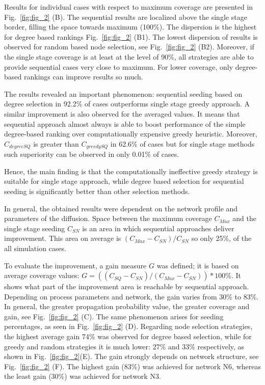 \documentclass[11pt]{article} %
\begin{document}
Results for individual cases with respect to maximum coverage are presented in Fig.~\ref{fig:fig_2} (B). The sequential  results are localized above the single stage border, filling the space towards maximum (100\%). The dispersion is the highest for degree based rankings Fig.~\ref{fig:fig_2} (B1). The lowest dispersion of results is observed for random based node selection, see Fig.~\ref{fig:fig_2} (B2). Moreover, if the single stage coverage is at least at the level of 90\%, all strategies are able to provide sequential cases very close to maximum. For lower coverage, only degree-based rankings can improve results so much.

The results revealed an important phenomenon: sequential seeding based on degree selection in 92.2\% of cases outperforms single stage greedy approach. A similar improvement is also observed for the averaged values. It means that sequential approach almost always is able to boost performance of the simple degree-based ranking over computationally expensive greedy heuristic. Moreover, $C_{degreeSQ}$ is greater than $C_{greedySQ}$ in 62.6\% of cases but for single stage methods such superiority can be observed in only 0.01\% of cases.

Hence, the main finding is that the computationally ineffective greedy strategy is suitable for single stage approach, while degree based selection for sequential seeding is significantly better than other selection methods. 

In general, the obtained results were dependent on the network profile and parameters of the diffusion. Space between the maximum coverage $C_{Max}$ and the single stage seeding $C_{SN}$ is an area in which sequential approaches deliver improvement. This area on average is $(C_{Max} - C_{SN})/C_{SN}$ so only 25\%, of the all simulation cases.

To evaluate the improvement, a gain measure $G$ was defined; it is based on average coverage values:  $G = ((C_{SQ} - C_{SN}) / (C_{Max} - C_{SN})) * 100\%$. It shows what part of the improvement area is reachable by sequential approach. Depending on process parameters and network, the gain varies from 30\% to 83\%. In general, the greater propagation probability value, the greater coverage and gain, see Fig.~\ref{fig:fig_2} (C). The same phenomenon arises for seeding percentages, as seen in Fig.~\ref{fig:fig_2} (D). Regarding node selection strategies, the highest average gain 74\% was observed for degree based selection, while for greedy and random strategies it is much lower: 27\% and 33\% respectively, as shown in Fig.~\ref{fig:fig_2}(E). The gain strongly depends on network structure, see Fig.~\ref{fig:fig_2} (F). The highest gain (83\%) was achieved for network N6, whereas the least gain (30\%) was achieved for network N3.
\end{document}
